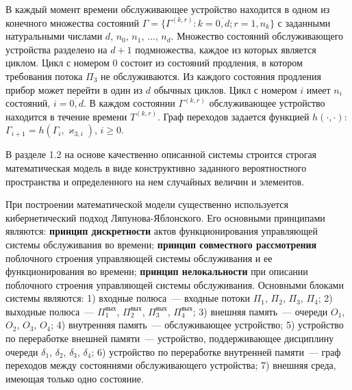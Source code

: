 \documentclass[14pt]{extarticle}
\theoremstyle{theorem}
\theoremstyle{remark}
\begin{document}
 В каждый момент времени обслуживающее устройство находится в одном из конечного множества состояний $\Gamma=\{\Gamma^{(k,r)} \colon k=\overline{0,d}; r=\overline{1,n_k}\}$ с заданными натуральными числами $d$, $n_0$, $n_1$, $\ldots$, $n_d$. Множество состояний обслуживающего устройства разделено на $d+1$ подмножества, каждое из которых является циклом. Цикл с номером $0$ состоит из состояний продления, в котором требования потока $\Pi_3$ не обслуживаются. Из каждого состояния продления прибор может перейти в один из $d$ обычных циклов. Цикл с номером $i$ имеет $n_i$ состояний, $i=\overline{0,d}$. В каждом состоянии $\Gamma^{(k,r)}$ обслуживающее устройство находится в течение времени $T^{(k,r)}$. Граф переходов задается функцией $h(\cdot, \cdot)$: $\Gamma_{i+1} = h(\Gamma_i, \varkappa_{3,i})$, $i\geqslant 0$.

В разделе 1.2 на основе качественно описанной системы строится строгая математическая модель в виде конструктивно заданного вероятностного пространства и определенного на нем случайных величин и элементов.

При построении математической модели существенно используется кибернетический подход Ляпунова-Яблонского. Его основными принципами являются: \textbf{принцип дискретности} актов функционирования управляющей системы обслуживания во времени; \textbf{принцип совместного рассмотрения} поблочного строения управляющей системы обслуживания и ее функционирования во времени; \textbf{принцип нелокальности} при описании поблочного строения управляющей системы обслуживания. Основными блоками системы являются: 1) входные полюса~--- входные потоки $\Pi_1$, $\Pi_2$, $\Pi_3$, $\Pi_4$; 2) выходные полюса~--- $\Pi^{\text{вых}}_1$, $\Pi^{\text{вых}}_2$, $\Pi^{\text{вых}}_3$, $\Pi^{\text{вых}}_4$; 3) внешняя память~--- очереди $O_1$, $O_2$, $O_3$, $O_4$; 4) внутренняя память~--- обслуживающее устройство; 5) устройство по переработке внешней памяти~--- устройство, поддерживающее дисциплину очереди $\delta_1$, $\delta_2$, $\delta_3$, $\delta_4$; 6) устройство по переработке внутренней памяти~--- граф переходов между состояниями обслуживающего устройства; 7) внешняя среда, имеющая только одно состояние.
\end{document}
